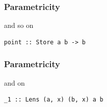 \begin{frame}[fragile]
\frametitle{Parametricity}
\begin{block}{and so on}
\begin{lstlisting}[style=haskell]
point :: Store a b -> b
\end{lstlisting}
\end{block}
\end{frame}

\begin{frame}[fragile]
\frametitle{Parametricity}
\begin{block}{and on}
\begin{lstlisting}[style=haskell]
_1 :: Lens (a, x) (b, x) a b
\end{lstlisting}
\end{block}
\end{frame}
